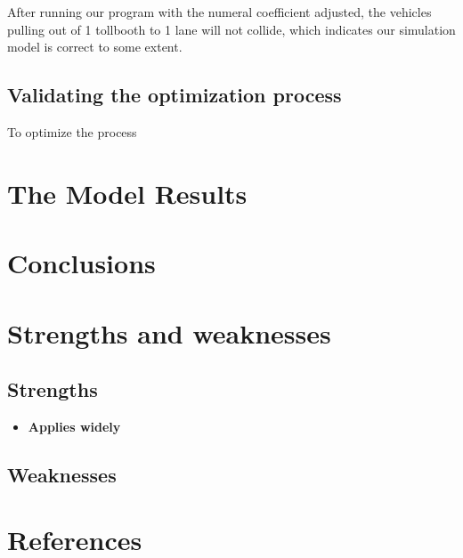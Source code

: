 \documentclass{mcmthesis}
\begin{document}
After running our program with the numeral coefficient adjusted, the vehicles pulling out of 1 tollbooth to 1 lane will not collide, which indicates our simulation model is correct to some extent.

\subsection{Validating the optimization process}

To optimize the process


\section{The Model Results}




\section{Conclusions}


\section{Strengths and weaknesses}


\subsection{Strengths}
\begin{itemize}
\item \textbf{Applies widely}\\


\end{itemize}
\subsection{Weaknesses}

\begin{appendices}



\end{appendices}


\section{References}
\nocite{*}



	
\end{document}
